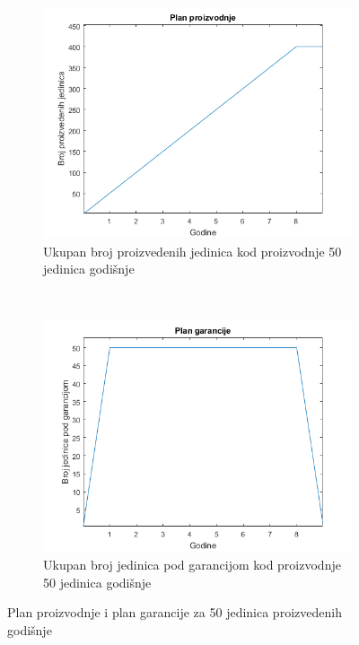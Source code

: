 \documentclass[12pt]{article}
\begin{document}
\begin{figure}[ht!]
    \centering
    \begin{subfigure}[t]{0.45\textwidth}
		\centering
		\includegraphics[scale = 0.45]{plan_proizvodnje/plan_proizvodnje-50}
		\caption{Ukupan broj proizvedenih jedinica kod proizvodnje 50 jedinica godišnje}
    \end{subfigure}%
    ~ 
    \begin{subfigure}[t]{0.45\textwidth}
		\centering
		\includegraphics[scale = 0.45]{plan_proizvodnje/plan_garancije-50}
		\caption{Ukupan broj jedinica pod garancijom kod proizvodnje 50 jedinica godišnje}
    \end{subfigure}
    \caption{Plan proizvodnje i plan garancije za 50 jedinica proizvedenih godišnje}
    \label{plan50}
\end{figure}
\end{document}
